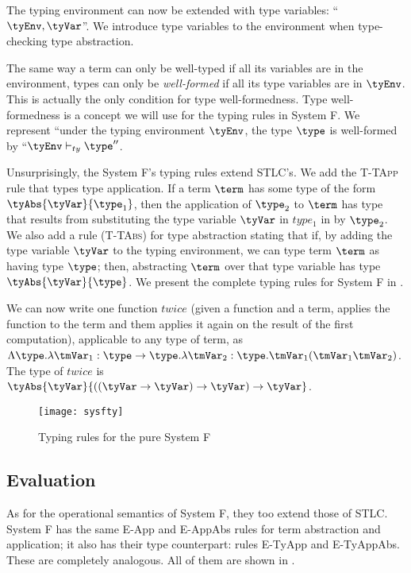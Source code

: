 The typing environment can now be extended with type variables: ``$\tyEnv,\tyVar$''. We introduce type variables to the environment when type-checking type abstraction.

The same way a term can only be well-typed if all its variables are in the environment, types can only be \textit{well-formed} if all its type variables are in $\tyEnv$. This is actually the only condition for type well-formedness. Type well-formedness is a concept we will use for the typing rules in System F. We represent ``under the typing environment $\tyEnv$, the type $\type$ is well-formed by ``$\tyEnv \vdash_{ty} \type''$.

Unsurprisingly, the System F's typing rules extend STLC's. We add the \textsc{T-TApp} rule that types type application. If a term $\term$ has some type of the form $\tyAbs{\tyVar}{\type_1}$, then the application of $\type_2$ to $\term$ has type that results from substituting the type variable $\tyVar$ in $type_1$ in by $\type_2$. We also add a rule (\textsc{T-TAbs}) for type abstraction stating that if, by adding the type variable $\tyVar$ to the typing environment, we can type term $\term$ as having type $\type$; then, abstracting $\term$ over that type variable has type $\tyAbs{\tyVar}{\type}$. We present the complete typing rules for System F in .

We can now write one function $twice$ (given a function and a term, applies the function to the term and them applies it again on the result of the first computation), applicable to any type of term, as $\Lambda \type. \lambda \tmVar_1: \type \rightarrow \type . \lambda \tmVar_2:\type. \tmVar_1 (\tmVar_1 \tmVar_2)$. The type of $twice$ is $\tyAbs{\tyVar}{((\tyVar \rightarrow \tyVar) \rightarrow \tyVar) \rightarrow \tyVar}$.

\begin{figure}
  \centering
  \texttt{[image: sysfty]}
  \caption{Typing rules for the pure System F}
  \label{sysfty}
\end{figure}
\subsection{Evaluation}
As for the operational semantics of System F, they too extend those of STLC. System F has the same E-App and E-AppAbs rules for term abstraction and application; it also has their type counterpart: rules E-TyApp and E-TyAppAbs. These are completely analogous. All of them are shown in .

